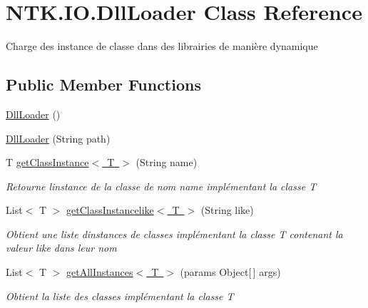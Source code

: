 \hypertarget{class_n_t_k_1_1_i_o_1_1_dll_loader}{}\section{N\+T\+K.\+I\+O.\+Dll\+Loader Class Reference}
\label{class_n_t_k_1_1_i_o_1_1_dll_loader}


Charge des instance de classe dans des librairies de manière dynamique  


\subsection*{Public Member Functions}
\begin{DoxyCompactItemize}
\item 
\mbox{\hyperlink{class_n_t_k_1_1_i_o_1_1_dll_loader_ab520650d43c7a587abae9920b4557a21}{Dll\+Loader}} ()
\item 
\mbox{\hyperlink{class_n_t_k_1_1_i_o_1_1_dll_loader_a5bc3e186eb39dfa7f2d5b3ea9e108271}{Dll\+Loader}} (String path)
\item 
T \mbox{\hyperlink{class_n_t_k_1_1_i_o_1_1_dll_loader_a6056f6798ccb621f64da1654848b0429}{get\+Class\+Instance$<$ T $>$}} (String name)
\begin{DoxyCompactList}\small\item\em Retourne l\textquotesingle{}instance de la classe de nom {\ttfamily name} implémentant la classe T \end{DoxyCompactList}\item 
List$<$ T $>$ \mbox{\hyperlink{class_n_t_k_1_1_i_o_1_1_dll_loader_a6dc532c035af23d0bbcb057dcdc9482b}{get\+Class\+Instancelike$<$ T $>$}} (String like)
\begin{DoxyCompactList}\small\item\em Obtient une liste d\textquotesingle{}instances de classes implémentant la classe T contenant la valeur like dans leur nom \end{DoxyCompactList}\item 
List$<$ T $>$ \mbox{\hyperlink{class_n_t_k_1_1_i_o_1_1_dll_loader_a64a29004a749655382830040714013fd}{get\+All\+Instances$<$ T $>$}} (params Object\mbox{[}$\,$\mbox{]} args)
\begin{DoxyCompactList}\small\item\em Obtient la liste des classes implémentant la classe T \end{DoxyCompactList}\end{DoxyCompactItemize}


